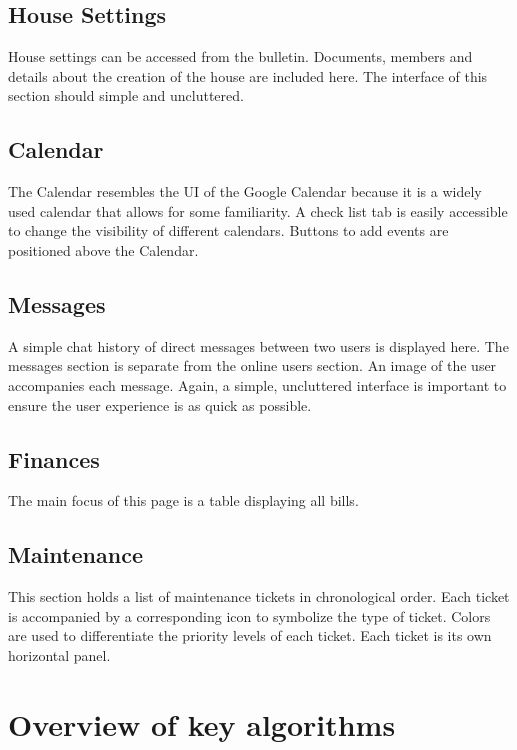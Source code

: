 \documentclass[12pt]{article}
\begin{document}
\subsection{House Settings}
House settings can be accessed from the bulletin. Documents, members and details about the creation of the house are included here. The interface of this section should simple and uncluttered.

\subsection{Calendar}
The Calendar resembles the UI of the Google Calendar because it is a widely used calendar that allows for some familiarity. A check list tab is easily accessible to change the visibility of different calendars. Buttons to add events are positioned above the Calendar.

\subsection{Messages}
A simple chat history of direct messages between two users is displayed here. The messages section is separate from the online users section. An image of the user accompanies each message. Again, a simple, uncluttered interface is important to ensure the user experience is as quick as possible.

\subsection{Finances}
The main focus of this page is a table displaying all bills.

\subsection{Maintenance}
This section holds a list of maintenance tickets in chronological order. Each ticket is accompanied by a corresponding icon to symbolize the type of ticket. Colors are used to differentiate the priority levels of each ticket. Each ticket is its own horizontal panel.

%
\section{Overview of key algorithms}

\clearpage
%
\end{document}
